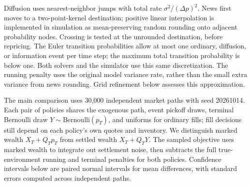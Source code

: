 Diffusion uses nearest-neighbor jumps with total rate
$\sigma^2/(\Delta p)^2$. News first moves to a two-point-kernel destination;
positive linear interpolation is implemented in simulation as mean-preserving
random rounding onto adjacent probability nodes. Crossing is tested at the
unrounded destination, before repricing. The Euler transition probabilities
allow at most one ordinary, diffusion, or information event per time step;
the maximum total transition probability is below one. Both solvers and the
simulator use this same discretization. The running penalty uses the original
model variance rate, rather than the small extra variance from news rounding.
Grid refinement below assesses this approximation.

The main comparison uses 30,000 independent market paths with seed 20261014.
Each pair of policies shares the exogenous path, event pickoff draws, terminal
Bernoulli draw $Y\sim\mathrm{Bernoulli}(p_T)$, and uniforms for ordinary fills;
fill decisions still depend on each policy's own quotes and inventory.
We distinguish marked wealth $X_T+Q_Tp_T$ from settled wealth $X_T+Q_TY$.
The sampled objective uses marked wealth to integrate out settlement noise,
then subtracts the full true-environment running and terminal penalties for
both policies. Confidence intervals below are paired normal intervals for mean
differences, with standard errors computed across independent paths.

